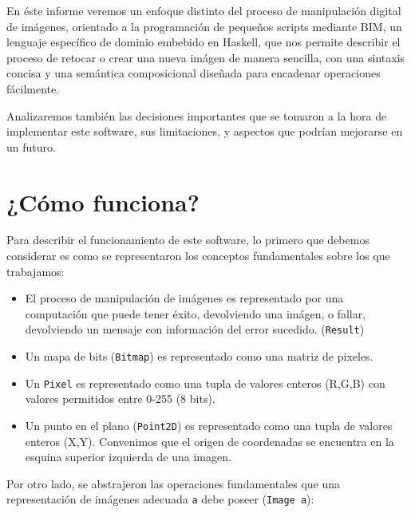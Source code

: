 \documentclass[a4paper, 11pt]{article} %
\begin{document}
En éste informe veremos un enfoque distinto del proceso de manipulación digital de imágenes, orientado a la programación de pequeños scripts mediante BIM, un lenguaje específico de dominio embebido en Haskell, que nos permite describir el proceso de retocar o crear una nueva imágen de manera sencilla, con una sintaxis concisa y una semántica composicional diseñada para encadenar operaciones fácilmente.

Analizaremos también las decisiones importantes que se tomaron a la hora de implementar este software, sus limitaciones, y aspectos que podrían mejorarse en un futuro.



\pagebreak


\section*{¿Cómo funciona?}

	Para describir el funcionamiento de este software, lo primero que debemos considerar es como se representaron los conceptos fundamentales sobre los que trabajamos:

	\begin{itemize}
	    \item El proceso de manipulación de imágenes es representado por una computación que puede tener éxito, devolviendo una imágen, o fallar, devolviendo un mensaje con información del error sucedido. (\texttt{Result})
		\item Un mapa de bits (\texttt{Bitmap}) es representado como una matriz de pixeles. 
		\item Un \texttt{Pixel} es representado como una tupla de valores enteros	  (R,G,B) con valores permitidos entre 0-255 (8 bits).
		\item Un punto en el plano (\texttt{Point2D}) es representado como una tupla de valores enteros (X,Y). Convenimos que el origen de coordenadas se encuentra en la esquina superior izquierda de una imagen.
	\end{itemize} 

\noindent Por otro lado, se abstrajeron las operaciones fundamentales que una representación de imágenes adecuada \texttt{a} debe poseer (\texttt{Image a}):\\
	
\end{document}
